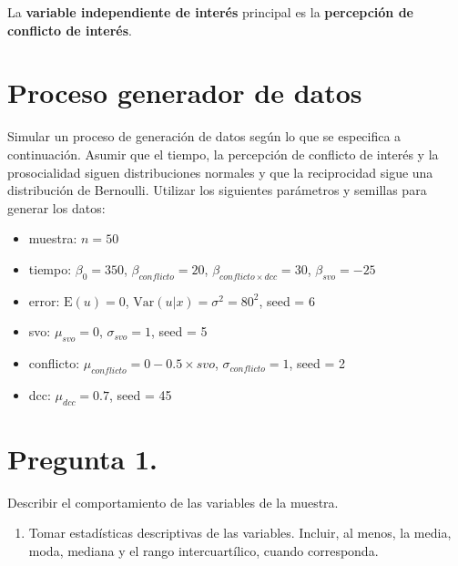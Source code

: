 \documentclass[
  spanish,
  10pt,
]{article}
\providecommand{\tightlist}{%
  \setlength{\itemsep}{0pt}\setlength{\parskip}{0pt}}
\begin{document}
La \textbf{variable independiente de interés} principal es la
\textbf{percepción de conflicto de interés}.

\section{Proceso generador de datos}\label{proceso-generador-de-datos}

Simular un proceso de generación de datos según lo que se especifica a
continuación. Asumir que el tiempo, la percepción de conflicto de
interés y la prosocialidad siguen distribuciones normales y que la
reciprocidad sigue una distribución de Bernoulli. Utilizar los
siguientes parámetros y semillas para generar los datos:

\begin{itemize}
\tightlist
\item
  muestra: \(n = 50\)
\item
  tiempo: \(\beta_0 = 350\), \(\beta_{conflicto} = 20\),
  \(\beta_{conflicto \times dcc} = 30\), \(\beta_{svo} = -25\)
\item
  error: \(\mathrm{E}(u) = 0\), \(\mathrm{Var}(u|x) = \sigma^2 = 80^2\),
  seed = 6
\item
  svo: \(\mu_{svo} = 0\), \(\sigma_{svo} = 1\), seed = 5
\item
  conflicto: \(\mu_{conflicto} = 0 - 0.5 \times svo\),
  \(\sigma_{conflicto} = 1\), seed = 2
\item
  dcc: \(\mu_{dcc} = 0.7\), seed = 45
\end{itemize}

\newpage

\section{Pregunta 1.}\label{pregunta-1.}

Describir el comportamiento de las variables de la muestra.

\begin{enumerate}
\def\labelenumi{(\alph{enumi})}
\tightlist
\item
  Tomar estadísticas descriptivas de las variables. Incluir, al menos,
  la media, moda, mediana y el rango intercuartílico, cuando
  corresponda.
\end{enumerate}
\end{document}
